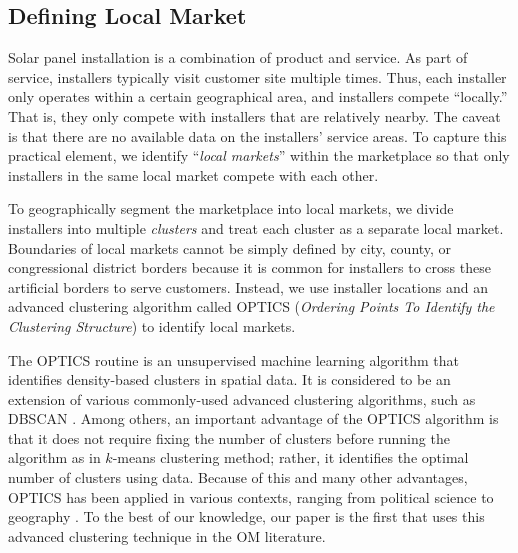 \documentclass[mnsc,blindrev]{informs3}
\begin{document}
	
	\subsection{Defining Local Market}
	\label{defining_local_market}
	
	
	Solar panel installation is a combination of product and service. As part of service, installers typically visit customer site multiple times. Thus, each installer only operates  within a certain geographical area, and installers compete ``locally.'' That is, they only compete with installers that are relatively nearby. The caveat is that there are no available data on the installers' service areas. To capture this practical element, we identify ``\emph{local markets}'' within the marketplace so that only installers in the same local market compete with each other.
	
	To geographically segment the marketplace into local markets, we divide installers into multiple \emph{clusters} and treat each cluster as a separate local market. Boundaries of local markets cannot be simply defined by city, county, or congressional district borders because it is common for installers to cross these artificial borders to serve customers. Instead, we use installer locations and an advanced clustering algorithm called OPTICS (\textit{Ordering Points To Identify the Clustering Structure}) to identify local markets.
	
	The OPTICS routine is an unsupervised machine learning algorithm that identifies density-based clusters in spatial data. It is considered to be an extension of various commonly-used advanced clustering algorithms, such as DBSCAN \citep{kanagala2016comparative}. Among others, an important advantage of the OPTICS algorithm is that it does not require fixing the number of clusters before running the algorithm as in $k$-means clustering method; rather, it identifies the optimal number of clusters using data. Because of this and many other advantages, OPTICS has been applied in various contexts, ranging from political science \citep{davidson2019neighborhood} to geography \citep{teimouri2016method}. To the best of our knowledge, our paper is the first that uses this advanced clustering technique in the OM literature.
	
	
\end{document}
